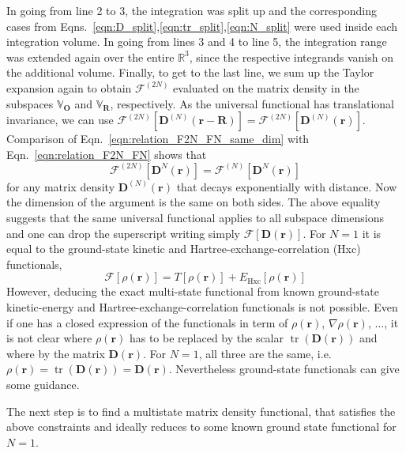 \documentclass[journal=jacsat,manuscript=article]{achemso}
\DeclareMathOperator{\tr}{tr}
\newcommand\m[1]{\mathbf{#1}}
\renewcommand\vec[1]{\mathbf{#1}}
\begin{document}
In going from line 2 to 3, the integration was split up and the corresponding cases from Eqns.~\ref{eqn:D_split},\ref{eqn:tr_split},\ref{eqn:N_split} were used inside each integration volume. In going from lines 3 and 4 to line 5, the integration range was extended again over the entire $\mathbb{R}^3$, since the respective integrands vanish on the additional volume. Finally, to get to the last line, we sum up the Taylor expansion again to obtain $\mathcal{F}^{(2N)}$ evaluated on the matrix density in the subspaces $\mathbb{V}_{\vec{O}}$ and $\mathbb{V}_{\vec{R}}$, respectively. As the universal functional has translational invariance, we can use $\mathcal{F}^{(2N)}[\m{D}^{(N)}(\vec{r}-\vec{R})] = \mathcal{F}^{(2N)}[\m{D}^{(N)}(\vec{r})]$.
Comparison of Eqn.~\ref{eqn:relation_F2N_FN_same_dim} with Eqn.~\ref{eqn:relation_F2N_FN} shows that
\begin{equation}
 \mathcal{F}^{(2N)}[\m{D}^{N}(\vec{r})] = \mathcal{F}^{(N)}[\m{D}^{N}(\vec{r})]
\end{equation}
for any matrix density $\m{D}^{(N)}(\vec{r})$ that decays exponentially with distance.
Now the dimension of the argument is the same on both sides. The above equality suggests that the same universal functional applies to all subspace dimensions and one can drop the superscript writing simply $\mathcal{F}[\m{D}(\vec{r})]$. For $N=1$ it is equal to the ground-state kinetic and Hartree-exchange-correlation (Hxc) functionals,
\begin{equation}
 \mathcal{F}[\rho(\vec{r})] = T[\rho(\vec{r})] + E_{\text{Hxc}}[\rho(\vec{r})]
\end{equation}
However, deducing the exact multi-state functional from known ground-state kinetic-energy and Hartree-exchange-correlation functionals is not possible. Even if one has a closed expression of the functionals in term of $\rho(\vec{r})$, $\nabla \rho(\vec{r})$, $\ldots$, it is not clear where $\rho(\vec{r})$ has to be replaced by the scalar $\tr(\m{D}(\vec{r}))$ and where by the matrix $\m{D}(\vec{r})$. For $N=1$, all three are the same, i.e. $\rho(\vec{r}) = \tr(\m{D}(\vec{r})) = \m{D}(\vec{r})$.
Nevertheless ground-state functionals can give some guidance.

The next step is to find a multistate matrix density functional, that satisfies the above constraints and ideally reduces to some known ground state functional for $N=1$.
\end{document}

